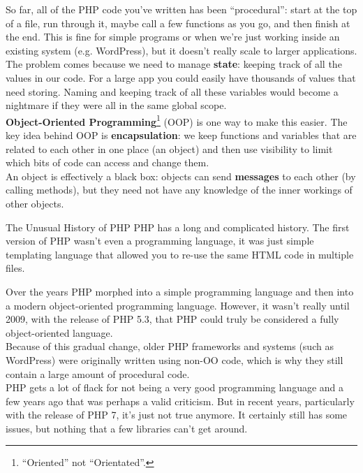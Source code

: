 So far, all of the PHP code you've written has been ``procedural'': start at the top of a file, run through it, maybe call a few functions as you go, and then finish at the end. This is fine for simple programs or when we're just working inside an existing system (e.g. WordPress), but it doesn't really scale to larger applications.
\\

The problem comes because we need to manage \textbf{state}: keeping track of all the values in our code. For a large app you could easily have thousands of values that need storing. Naming and keeping track of all these variables would become a nightmare if they were all in the same global scope.
\\

\textbf{Object-Oriented Programming}\footnote{``Oriented'' not ``Orientated''.} (OOP) is one way to make this easier. The key idea behind OOP is \textbf{encapsulation}: we keep functions and variables that are related to each other in one place (an object) and then use visibility to limit which bits of code can access and change them.
\\

An object is effectively a black box: objects can send \textbf{messages} to each other (by calling methods), but they need not have any knowledge of the inner workings of other objects.


\pagebreak


\begin{infobox}{The Unusual History of PHP}
    PHP has a long and complicated history. The first version of PHP wasn't even a programming language, it was just simple templating language that allowed you to re-use the same HTML code in multiple files.


    Over the years PHP morphed into a simple programming language and then into a modern object-oriented programming language. However, it wasn't really until 2009, with the release of PHP 5.3, that PHP could truly be considered a fully object-oriented language.
    \\

    Because of this gradual change, older PHP frameworks and systems (such as WordPress) were originally written using non-OO code, which is why they still contain a large amount of procedural code.
    \\

    PHP gets a lot of flack for not being a very good programming language and a few years ago that was perhaps a valid criticism. But in recent years, particularly with the release of PHP 7, it's just not true anymore. It certainly still has some issues, but nothing that a few libraries can't get around.

\end{infobox}

